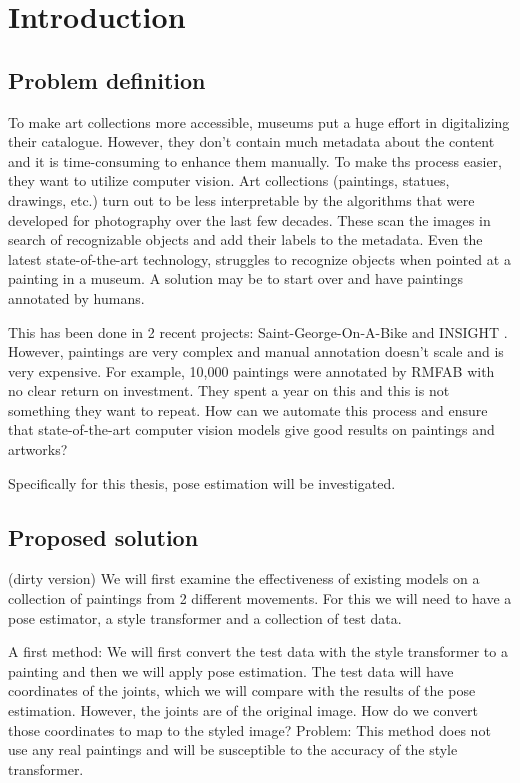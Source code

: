 \chapter{Introduction}
\label{chap:intro}

\section{Problem definition}

To make art collections more accessible, museums put a huge effort in digitalizing their catalogue.
However, they don't contain much metadata about the content and it is time-consuming to enhance them manually.
To make ths process easier, they want to utilize computer vision.
Art collections (paintings, statues, drawings, etc.) turn out to be less interpretable by the algorithms that were developed for photography over the last few decades. 
These scan the images in search of recognizable objects and add their labels to the metadata.
Even the latest state-of-the-art technology, struggles to recognize objects when pointed at a painting in a museum.  
A solution may be to start over and have paintings annotated by humans.  
  
This has been done in 2 recent projects:  Saint-George-On-A-Bike \cite{GeorgeOnABike} and INSIGHT \cite{Insight}.
However, paintings are very complex and manual annotation doesn't scale and is very expensive.
For example, 10,000 paintings were annotated by \gls{RMFAB} with no clear return on investment.
They spent a year on this and this is not something they want to repeat.
How can we automate this process and ensure that state-of-the-art computer vision models give good results on paintings and artworks?  
  
Specifically for this thesis, pose estimation will be investigated.

\section{Proposed solution}
(dirty version)
We will first examine the effectiveness of existing models on a collection of paintings from 2 different movements.
For this we will need to have a pose estimator, a style transformer and a collection of test data. 

A first method: We will first convert the test data with the style transformer to a painting and then we will apply pose estimation.
The test data will have coordinates of the joints, which we will compare with the results of the pose estimation.
However, the joints are of the original image. How do we convert those coordinates to map to the styled image? 
Problem: This method does not use any real paintings and will be susceptible to the accuracy of the style transformer.  

